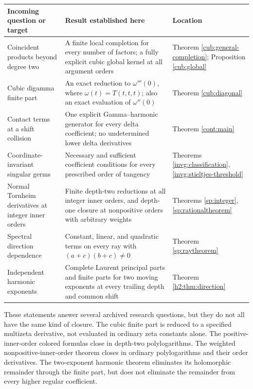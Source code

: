 \documentclass[11pt,a4paper]{article}
\theoremstyle{definition}
\theoremstyle{remark}
\numberwithin{equation}{section}
\begin{document}
\begin{longtable}{@{}>{\raggedright\arraybackslash}p{}
 >{\raggedright\arraybackslash}p{}
 >{\raggedright\arraybackslash}p{}@{}}
\toprule
Incoming question or target & Result established here & Location\\
\midrule
\endhead
Coincident products beyond degree two &
A finite local completion for every number of factors; a fully
explicit cubic global kernel at all argument orders &
Theorem \ref{cub:general-completion};
Proposition \ref{cub:global}\\[3pt]
Cubic digamma finite part &
An exact reduction to $\omega'''(0)$, where
$\omega(t)=T(t,t,t)$; also an exact evaluation of $\omega''(0)$ &
Theorem \ref{cub:diagonal}\\[3pt]
Contact terms at a shift collision &
One explicit Gamma--harmonic generator for every delta coefficient;
no undetermined lower delta derivatives &
Theorem \ref{cont:main}\\[3pt]
Coordinate-invariant singular germs &
Necessary and sufficient coefficient conditions for every prescribed
order of tangency &
Theorems \ref{invg:classification},
\ref{invg:stieltjes-threshold}\\[3pt]
Normal Tornheim derivatives at integer inner orders &
Finite depth-two reductions at all integer inner orders, and
depth-one closure at nonpositive orders with arbitrary weights &
Theorems \ref{sp:integer}, \ref{sp:rationaltheorem}\\[3pt]
Spectral direction dependence &
Constant, linear, and quadratic terms on every ray with
$(a+c)(b+c)\ne0$ &
Theorem \ref{sp:raytheorem}\\[3pt]
Independent harmonic exponents &
Complete Laurent principal parts and finite parts for two moving
exponents at every trailing depth and common shift &
Theorem \ref{h2:thm:direction}\\
\bottomrule
\end{longtable}

These statements answer several archived research questions, but they
do not all have the same kind of closure. The cubic finite part is
reduced to a specified multizeta derivative, not evaluated in ordinary
zeta constants alone. The positive-inner-order colored formulas close
in depth-two polylogarithms. The weighted nonpositive-inner-order
theorem closes in ordinary polylogarithms and their order derivatives.
The two-exponent harmonic theorem eliminates its holomorphic
remainder through the finite part, but does not eliminate the
remainder from every higher regular coefficient.
\end{document}
